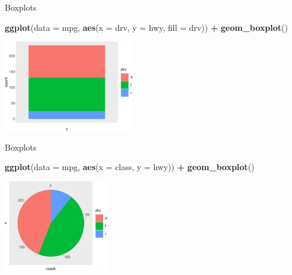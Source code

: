 \documentclass[ignorenonframetext,]{beamer}
\newenvironment{Shaded}{\begin{snugshade}}{\end{snugshade}}
\newcommand{\DataTypeTok}[1]{\textcolor[rgb]{0.13,0.29,0.53}{#1}}
\newcommand{\KeywordTok}[1]{\textcolor[rgb]{0.13,0.29,0.53}{\textbf{#1}}}
\newcommand{\NormalTok}[1]{#1}
\newcommand{\OperatorTok}[1]{\textcolor[rgb]{0.81,0.36,0.00}{\textbf{#1}}}
\newcommand{\StringTok}[1]{\textcolor[rgb]{0.31,0.60,0.02}{#1}}
\begin{document}
\begin{frame}[fragile]{Boxplots}
\protect\hypertarget{boxplots-3}{}

\begin{Shaded}
\begin{Highlighting}[]
\KeywordTok{ggplot}\NormalTok{(}\DataTypeTok{data =}\NormalTok{ mpg, }
       \KeywordTok{aes}\NormalTok{(}\DataTypeTok{x =}\NormalTok{ drv, }\DataTypeTok{y =}\NormalTok{ hwy, }\DataTypeTok{fill =}\NormalTok{ drv)) }\OperatorTok{+}\StringTok{ }
\StringTok{  }\KeywordTok{geom_boxplot}\NormalTok{()}
\end{Highlighting}
\end{Shaded}

\begin{center}\includegraphics[height=150px]{data-visualization_files/figure-beamer/unnamed-chunk-142-1} \end{center}

\end{frame}

\begin{frame}[fragile]{Boxplots}
\protect\hypertarget{boxplots-4}{}

\begin{Shaded}
\begin{Highlighting}[]
\KeywordTok{ggplot}\NormalTok{(}\DataTypeTok{data =}\NormalTok{ mpg, }\KeywordTok{aes}\NormalTok{(}\DataTypeTok{x =}\NormalTok{ class, }\DataTypeTok{y =}\NormalTok{ hwy)) }\OperatorTok{+}\StringTok{ }
\StringTok{  }\KeywordTok{geom_boxplot}\NormalTok{()}
\end{Highlighting}
\end{Shaded}

\begin{center}\includegraphics[height=150px]{data-visualization_files/figure-beamer/unnamed-chunk-143-1} \end{center}

\end{frame}
\end{document}
